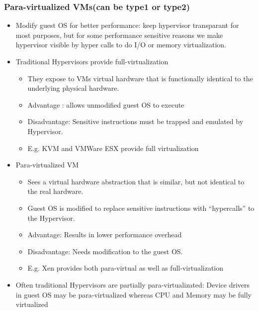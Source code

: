 \documentclass[12pt]{article}
\begin{document}
\subsubsection{Para-virtualized VMs(can be type1 or type2)}
\begin{itemize}
    \item Modify guest OS for better performance: keep hypervisor transparant for most purposes, but for some performance sensitive reasons we make hypervisor visible by hyper calls to do I/O or memory virtualization.
    \item Traditional Hypervisors provide full-virtualization \begin{itemize}
        \item They expose to VMs virtual hardware that is functionally identical to the underlying physical hardware.
        \item Advantage : allows unmodified guest OS to execute
        \item Disadvantage: Sensitive instructions must be trapped and emulated by Hypervisor.
        \item E.g. KVM and VMWare ESX provide full virtualization
    \end{itemize}
    \item Para-virtualized VM \begin{itemize}
        \item Sees a virtual hardware abstraction that is similar, but not identical to the real hardware.
        \item Guest OS is modified to replace sensitive instructions with “hypercalls” to the Hypervisor.
        \item Advantage: Results in lower performance overhead 
        \item Disadvantage: Needs modification to the guest OS.
        \item E.g. Xen provides both para-virtual as well as full-virtualization
    \end{itemize}
    \item Often traditional Hypervisors are partially para-virtualizated: Device drivers in guest OS may be para-virtualized whereas CPU and Memory may be fully virtualized
\end{itemize}
\end{document}
